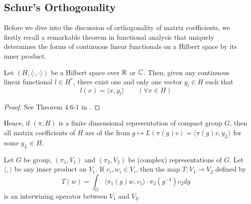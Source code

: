 \subsection{Schur's Orthogonality}

Before we dive into the discussion of orthogonality of matrix coefficients, we
firstly recall a remarkable theorem in functional analysis that uniquely
determines the forms of continuous linear functionals on a Hilbert space by its
inner product.

\begin{thm} \label{riesz-rep-thm-hilbert}
  Let $(H,\langle \cdot, \cdot \rangle)$ be a Hilbert space over $\operatorname{\mathbb{R}}$ or $\operatorname{\mathbb{C}}$.  Then, given any
  continuous linear functional $l \in H^*$, there exist one and only one vector
  $y_l \in H$ such that
  \[
    l(x) = \langle x, y_l \rangle \qquad (\forall x \in H)
  \]
\end{thm}

\begin{proof}
  See Theorem 4.6-1 in \cite{ciarlet2013linear}.
\end{proof}

Hence, if $(\pi,H)$ is a finite dimensional representation of compact group $G$,
then all matrix coefficients of $H$ are of the from $g \mapsto L(\pi(g)v) =
\langle \pi(g)v, y_L \rangle$ for some $y_L \in H$.

\begin{lem}\label{schur-con-inter-op}
  Let $G$ be group, $(\pi_1, V_1)$ and $(\pi_2, V_2)$ be (complex)
  representations of $G$. Let $\langle , \rangle$ be any inner product on $V_1$.
  If $v_i,w_i \in V_i$, then the map $T : V_1 \to V_2$ defined by
  \[
    T(w) = \int_G \langle \pi_1(g)w,v_1 \rangle \cdot \pi_2(g^{-1}) v_2 dg
  \]
  is an interwining operator between $V_1$ and $V_2$.
\end{lem}

